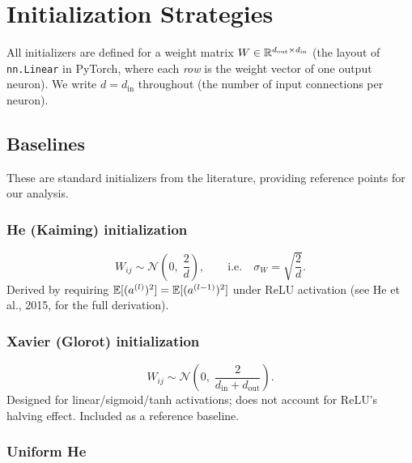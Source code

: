 \chapter{Initialization Strategies}
\label{ch:initializers}

All initializers are defined for a weight matrix
$W \in \mathbb{R}^{d_{\mathrm{out}} \times d_{\mathrm{in}}}$
(the layout of \texttt{nn.Linear} in PyTorch, where each \emph{row}
is the weight vector of one output neuron).
We write $d = d_{\mathrm{in}}$ throughout (the number of input
connections per neuron).

\section{Baselines}

\noindent
These are standard initializers from the literature, providing
reference points for our analysis.

\subsection{He (Kaiming) initialization~\cite{he2015delving}}
\label{sec:init_he}

\begin{equation}\label{eq:he}
  W_{ij} \sim \mathcal{N}\!\left(0,\; \frac{2}{d}\right),
  \qquad\text{i.e.}\quad
  \sigma_W = \sqrt{\frac{2}{d}}.
\end{equation}
Derived by requiring $\mathbb{E}[(a^{(l)})^2] = \mathbb{E}[(a^{(l-1)})^2]$
under ReLU activation (see He et al., 2015, for the full derivation).

\subsection{Xavier (Glorot) initialization~\cite{glorot2010understanding}}

\begin{equation}
  W_{ij} \sim \mathcal{N}\!\left(0,\; \frac{2}{d_{\mathrm{in}} + d_{\mathrm{out}}}\right).
\end{equation}
Designed for linear/sigmoid/tanh activations; does not account for
ReLU's halving effect.  Included as a reference baseline.

\subsection{Uniform He}

